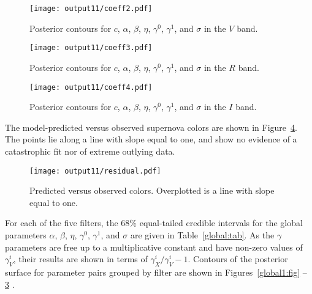 \documentclass{aastex61}   	%
\begin{document}
\begin{figure}[htbp] %
   \centering
   \texttt{[image: output11/coeff2.pdf]} 
            \caption{Posterior contours for $c$, $\alpha$, $\beta$, $\eta$, $\gamma^0$, $\gamma^1$, and $\sigma$ in the $V$ band.
 \label{global3:fig}}
\end{figure}

\begin{figure}[htbp] %
   \centering
      \texttt{[image: output11/coeff3.pdf]} 
            \caption{Posterior contours for $c$, $\alpha$, $\beta$, $\eta$, $\gamma^0$, $\gamma^1$, and $\sigma$ in the $R$ band.
 \label{global4:fig}}
\end{figure}

\begin{figure}[htbp] %
   \centering
         \texttt{[image: output11/coeff4.pdf]} 
            \caption{Posterior contours for $c$, $\alpha$, $\beta$, $\eta$, $\gamma^0$, $\gamma^1$, and $\sigma$ in the $I$ band.
 \label{global5:fig}}
\end{figure}


The model-predicted versus observed supernova colors are shown in Figure~\ref{residual:fig}.
The points lie along a line with slope equal to one, and show no evidence of a catastrophic fit nor of extreme
outlying data.

\begin{figure}[htbp] %
   \centering
   \texttt{[image: output11/residual.pdf]} 
            \caption{Predicted versus observed colors.  Overplotted is a line with slope equal to one.
            \label{residual:fig}}
\end{figure}


For each of the five filters, the 68\%  equal-tailed credible intervals for the global parameters $\alpha$, $\beta$, $\eta$, $\gamma^0$, $\gamma^1$, and $\sigma$
are given in Table~\ref{global:tab}.
As the $\gamma$ parameters are free up to a multiplicative constant and have non-zero values of $\gamma^i_V$,
their results are shown in terms of $\gamma^i_X/\gamma^i_V-1$.
Contours of the posterior surface for parameter pairs grouped by filter are shown in Figures~\ref{global1:fig} -- \ref{global5:fig} .
\end{document}
